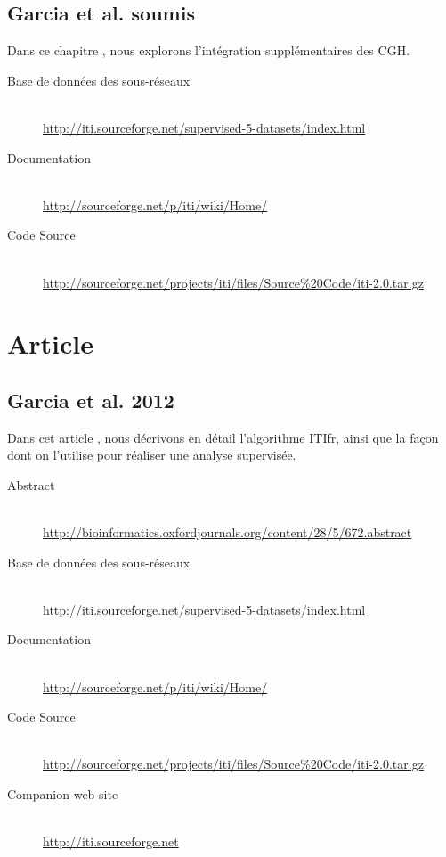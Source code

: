         

      \subsection*{\textcolor{mygrey}{Garcia et al. soumis}}\label{app:Garcia2013b}
        Dans ce chapitre \citep{Garcia2013b}, nous explorons l'intégration supplémentaires des CGH.

        \begin{description}
          \item [Base de données des sous-réseaux]    \hfill \\
            \url{http://iti.sourceforge.net/supervised-5-datasets/index.html}
          \item [Documentation]                       \hfill \\
            \url{http://sourceforge.net/p/iti/wiki/Home/}
          \item [Code Source]                         \hfill \\
            \url{http://sourceforge.net/projects/iti/files/Source%20Code/iti-2.0.tar.gz}
        \end{description}

        

  \section*{\textcolor{mygrey}{Article}}
    \subsection*{\textcolor{mygrey}{Garcia et al. 2012}}\label{app:Garcia2012}
      Dans cet article \citep{Garcia2012}, nous décrivons en détail l'algorithme \acs{ITIfr}, ainsi que la façon dont on l'utilise pour réaliser une analyse supervisée.

        \begin{description}
          \item [Abstract]    \hfill \\
            \url{http://bioinformatics.oxfordjournals.org/content/28/5/672.abstract}
          \item [Base de données des sous-réseaux]    \hfill \\
            \url{http://iti.sourceforge.net/supervised-5-datasets/index.html}
          \item [Documentation]                       \hfill \\
            \url{http://sourceforge.net/p/iti/wiki/Home/}
          \item [Code Source]                         \hfill \\
            \url{http://sourceforge.net/projects/iti/files/Source%20Code/iti-2.0.tar.gz}
          \item [Companion web-site]    \hfill \\
            \url{http://iti.sourceforge.net}
        \end{description}

    
